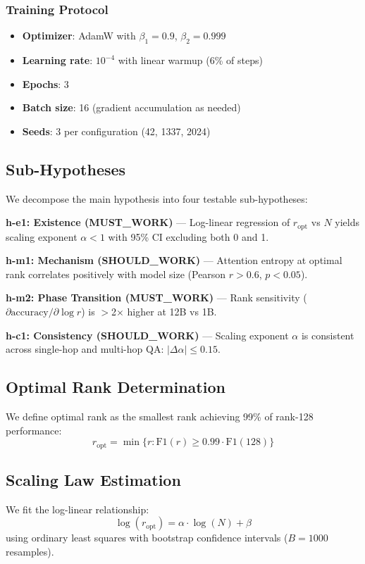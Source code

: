 \subsubsection{Training Protocol}

\begin{itemize}
    \item \textbf{Optimizer}: AdamW with $\beta_1=0.9$, $\beta_2=0.999$
    \item \textbf{Learning rate}: $10^{-4}$ with linear warmup (6\% of steps)
    \item \textbf{Epochs}: 3
    \item \textbf{Batch size}: 16 (gradient accumulation as needed)
    \item \textbf{Seeds}: 3 per configuration (42, 1337, 2024)
\end{itemize}

\subsection{Sub-Hypotheses}

We decompose the main hypothesis into four testable sub-hypotheses:

\textbf{h-e1: Existence (MUST\_WORK)} --- Log-linear regression of $r_{\text{opt}}$ vs $N$ yields scaling exponent $\alpha < 1$ with 95\% CI excluding both 0 and 1.

\textbf{h-m1: Mechanism (SHOULD\_WORK)} --- Attention entropy at optimal rank correlates positively with model size (Pearson $r > 0.6$, $p < 0.05$).

\textbf{h-m2: Phase Transition (MUST\_WORK)} --- Rank sensitivity ($\partial \text{accuracy} / \partial \log r$) is $>$2$\times$ higher at 12B vs 1B.

\textbf{h-c1: Consistency (SHOULD\_WORK)} --- Scaling exponent $\alpha$ is consistent across single-hop and multi-hop QA: $|\Delta\alpha| \leq 0.15$.

\subsection{Optimal Rank Determination}

We define optimal rank as the smallest rank achieving 99\% of rank-128 performance:
\begin{equation}
r_{\text{opt}} = \min\{r : \text{F1}(r) \geq 0.99 \cdot \text{F1}(128)\}
\end{equation}

\subsection{Scaling Law Estimation}

We fit the log-linear relationship:
\begin{equation}
\log(r_{\text{opt}}) = \alpha \cdot \log(N) + \beta
\end{equation}
using ordinary least squares with bootstrap confidence intervals ($B=1000$ resamples).
